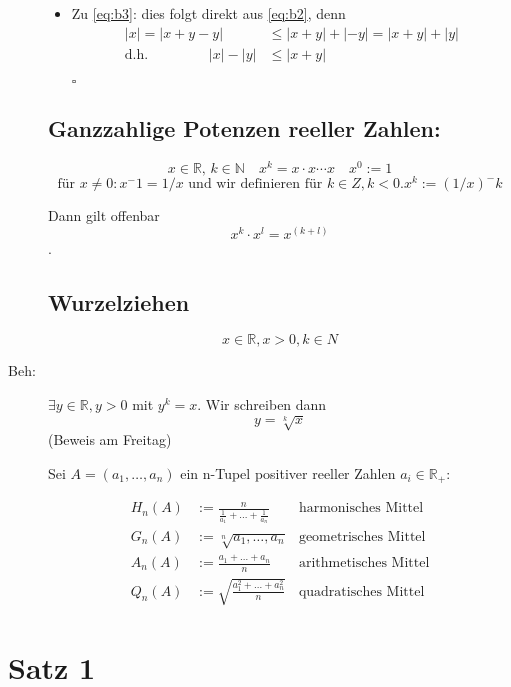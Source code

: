 \documentclass[12pt,a4paper,leqno]{article}
\begin{document}
\begin{description}
\begin{itemize}
\item[] Zu \eqref{eq:b3}: dies folgt direkt aus \eqref{eq:b2}, denn  
\begin{align*}
	|x| = |x+y-y| &\leq |x+y|+|-y| = |x + y| + |y| \\
\textrm{d.h. } \qquad \qquad |x|-|y| &\leq |x+y|
\end{align*}
	 \begin{flushright}$\square$\end{flushright}


\end{itemize}

\subsection*{Ganzzahlige Potenzen reeller Zahlen:}
$$x \in \mathbb{R} \textrm{, } k \in \mathbb{N} \quad x^k = x  \cdot  x  \cdots  x \quad x^0 := 1$$
$$\textrm{für } x \neq 0 : x^-1 = 1 / x \textrm{ und wir definieren für } k \in Z, k < 0. x ^ k := (1 / x )^-k$$

Dann gilt offenbar $$x^k  \cdot  x ^l = x ^ (k+l)$$.

\subsection*{Wurzelziehen}

$$x \in \mathbb{R}, x > 0, k \in N$$

\item[Beh:] $∃y \in \mathbb{R}, y > 0$ mit $y ^ k = x$. Wir schreiben dann $$y = \sqrt[k]{x}$$
(Beweis am Freitag)

\newpage

Sei $A=(a_1,\dotsc, a_n)$ ein n-Tupel positiver reeller Zahlen $a_i \in \mathbb{R}_+$:

\begin{align}
	H_n(A) &:= \frac{n}{\frac{1}{a_1} + ... + \frac{1}{a_n}} & \textrm{harmonisches Mittel} \\
	G_n(A) &:= \sqrt[n]{a_1,\dotsc, a_n} & \textrm{geometrisches Mittel}\\
	A_n(A) &:= \frac{a_1 + ... + a_n}{n}  & \textrm{arithmetisches Mittel}\\
	Q_n(A) &:= \sqrt{\frac{a_1^2 + ... + a_n^2}{n}} & \textrm{quadratisches  Mittel}
\end{align}
\end{description}

\section*{Satz 1}
\end{document}
